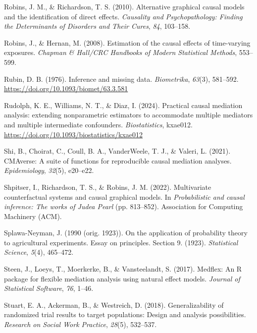 \documentclass[
  single column]{article}
\newlength{\cslhangindent}
\newenvironment{CSLReferences}[2] %
 {\begin{list}{}{%
  \setlength{\itemindent}{0pt}
  \setlength{\leftmargin}{0pt}
  \setlength{\parsep}{0pt}
  \ifodd #1
   \setlength{\leftmargin}{\cslhangindent}
   \setlength{\itemindent}{-1\cslhangindent}
  \fi
  \setlength{\itemsep}{#2\baselineskip}}}
 {\end{list}}
\begin{document}
\begin{CSLReferences}{1}{0}
Robins, J. M., \& Richardson, T. S. (2010). Alternative graphical causal
models and the identification of direct effects. \emph{Causality and
Psychopathology: Finding the Determinants of Disorders and Their Cures},
\emph{84}, 103--158.

Robins, J., \& Hernan, M. (2008). Estimation of the causal effects of
time-varying exposures. \emph{Chapman \& Hall/CRC Handbooks of Modern
Statistical Methods}, 553--599.

Rubin, D. B. (1976). Inference and missing data. \emph{Biometrika},
\emph{63}(3), 581--592. \url{https://doi.org/10.1093/biomet/63.3.581}

Rudolph, K. E., Williams, N. T., \& Diaz, I. (2024). {Practical causal
mediation analysis: extending nonparametric estimators to accommodate
multiple mediators and multiple intermediate confounders}.
\emph{Biostatistics}, kxae012.
\url{https://doi.org/10.1093/biostatistics/kxae012}

Shi, B., Choirat, C., Coull, B. A., VanderWeele, T. J., \& Valeri, L.
(2021). CMAverse: A suite of functions for reproducible causal mediation
analyses. \emph{Epidemiology}, \emph{32}(5), e20--e22.

Shpitser, I., Richardson, T. S., \& Robins, J. M. (2022). Multivariate
counterfactual systems and causal graphical models. In
\emph{Probabilistic and causal inference: The works of {J}udea {P}earl}
(pp. 813--852). Association for Computing Machinery (ACM).

Splawa-Neyman, J. (1990 (orig. 1923)). On the application of probability
theory to agricultural experiments. Essay on principles. Section 9.
(1923). \emph{Statistical Science}, \emph{5}(4), 465--472.

Steen, J., Loeys, T., Moerkerke, B., \& Vansteelandt, S. (2017).
Medflex: An {R} package for flexible mediation analysis using natural
effect models. \emph{Journal of Statistical Software}, \emph{76}, 1--46.

Stuart, E. A., Ackerman, B., \& Westreich, D. (2018). Generalizability
of randomized trial results to target populations: Design and analysis
possibilities. \emph{Research on Social Work Practice}, \emph{28}(5),
532--537.


\end{CSLReferences}
\end{document}
